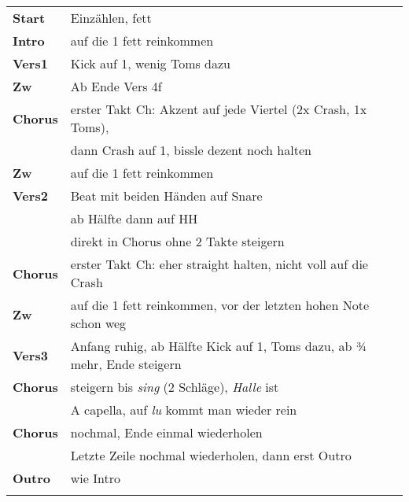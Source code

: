 \begin{tabular}{p{1.6cm}l}
	\textbf{Start}  & Einzählen, fett                                                         \\
	\textbf{Intro}  & auf die 1 fett reinkommen                                               \\
	\textbf{Vers1}  & Kick auf 1, wenig Toms dazu                                             \\
	\textbf{Zw}     & Ab Ende Vers 4f                                                         \\
	\textbf{Chorus} & erster Takt Ch: Akzent auf jede Viertel (2x Crash, 1x Toms),            \\
	                & dann Crash auf 1, bissle dezent noch halten                             \\
	\textbf{Zw}     & auf die 1 fett reinkommen                                               \\
	\textbf{Vers2}  & Beat mit beiden Händen auf Snare                                        \\
	                & ab Hälfte dann auf HH                                                   \\
	                & direkt in Chorus ohne 2 Takte steigern                                  \\
	\textbf{Chorus} & erster Takt Ch: eher straight halten, nicht voll auf die Crash          \\
	\textbf{Zw}     & auf die 1 fett reinkommen, vor der letzten hohen Note schon weg         \\
	\textbf{Vers3}  & Anfang ruhig, ab Hälfte Kick auf 1, Toms dazu, ab ¾ mehr, Ende steigern \\
	\textbf{Chorus} & steigern bis \textit{sing} (2 Schläge), \textit{Halle} ist              \\
	                & A capella, auf \textit{lu} kommt man wieder rein                        \\
	\textbf{Chorus} & nochmal, Ende einmal wiederholen                                        \\
	                & Letzte Zeile nochmal wiederholen, dann erst Outro                       \\
	\textbf{Outro}  & wie Intro                                                               \\
	                &                                                                         \\
\end{tabular}
